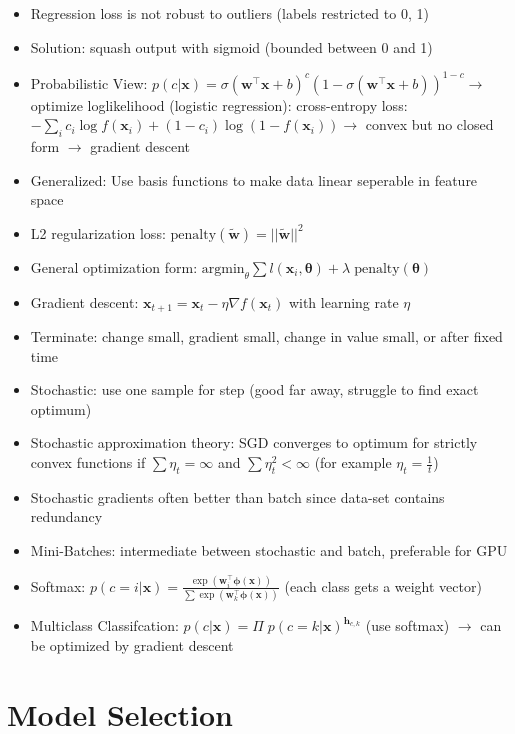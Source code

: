 \documentclass[11pt]{scrartcl}
\begin{document}
\begin{itemize}
    \item Regression loss is not robust to outliers (labels restricted to 0, 1)
    \item Solution: squash output with sigmoid (bounded between 0 and 1)
    \item Probabilistic View: \(p(c | \bm{x}) = \sigma (\bm{w}^\top \bm{x} + b)^c 
        (1 - \sigma (\bm{w}^\top \bm{x} + b))^{1 - c} \rightarrow\) optimize loglikelihood 
        (logistic regression): cross-entropy loss: \( - \sum_i c_i \log f ( \bm{x}_i ) + ( 1 - c_i ) \log ( 1 - f ( \bm{x}_i ) ) \rightarrow\) convex but no closed form \(\rightarrow\) 
        gradient descent
    \item Generalized: Use basis functions to make data linear seperable in feature space
    \item L2 regularization loss: \(\mathrm{penalty}(\tilde{\bm{w}}) = || \tilde{\bm{w}} ||^2\)
    \item General optimization form: \(\mathrm{argmin}_\theta \sum l(\bm{x}_i, \bm{\theta}) 
        + \lambda \; \mathrm{penalty}(\bm{\theta})\)
    \item Gradient descent: \(\bm{x}_{t + 1} = \bm{x}_t - \eta \nabla f(\bm{x}_t)\) with 
        learning rate \(\eta\)
    \item Terminate: change small, gradient small, change in value small, or after fixed time
    \item Stochastic: use one sample for step (good far away, struggle to find exact optimum)
    \item Stochastic approximation theory: SGD converges to optimum for strictly convex 
        functions if \(\sum \eta_t = \infty\) and \(\sum \eta_t^2 < \infty \) (for example 
        \(\eta_t = \frac{1}{t}\))
    \item Stochastic gradients often better than batch since data-set contains redundancy
    \item Mini-Batches: intermediate between stochastic and batch, preferable for GPU
    \item Softmax: \(p(c = i | \bm{x}) = 
        \frac{\exp (\bm{w}_i^\top \bm{\phi}(\bm{x}))}{\sum \exp (\bm{w}_k^\top 
        \bm{\phi}(\bm{x}))}\) (each class gets a weight vector)
    \item Multiclass Classifcation: \(p(c | \bm{x}) = \Pi \; 
        p(c = k | \bm{x})^{\bm{h}_{c, k}}\) (use softmax) \(\rightarrow\) can be optimized by 
        gradient descent
\end{itemize}

\section{Model Selection}
\end{document}
